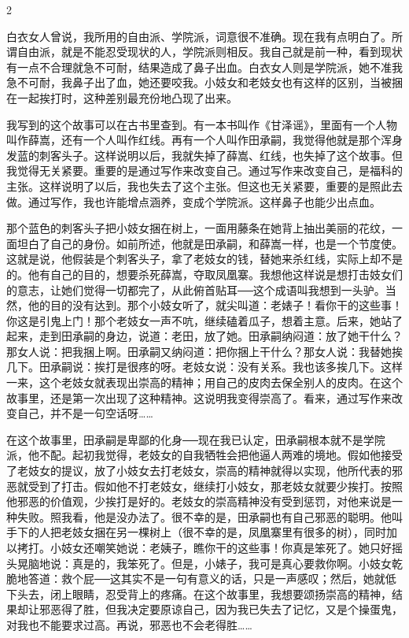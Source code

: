 2 

白衣女人曾说，我所用的自由派、学院派，词意很不准确。现在我有点明白了。所谓自由派，就是不能忍受现状的人，学院派则相反。我自己就是前一种，看到现状有一点不合理就急不可耐，结果造成了鼻子出血。白衣女人则是学院派，她不准我急不可耐，我鼻子出了血，她还要咬我。小妓女和老妓女也有这样的区别，当被捆在一起挨打时，这种差别最充份地凸现了出来。 

我写到的这个故事可以在古书里查到。有一本书叫作《甘泽谣》，里面有一个人物叫作薛嵩，还有一个人叫作红线。再有一个人叫作田承嗣，我觉得他就是那个浑身发蓝的刺客头子。这样说明以后，我就失掉了薛嵩、红线，也失掉了这个故事。但我觉得无关紧要。重要的是通过写作来改变自己。通过写作来改变自己，是福科的主张。这样说明了以后，我也失去了这个主张。但这也无关紧要，重要的是照此去做。通过写作，我也许能增点涵养，变成个学院派。这样鼻子也能少出点血。 

那个蓝色的刺客头子把小妓女捆在树上，一面用藤条在她背上抽出美丽的花纹，一面坦白了自己的身份。如前所述，他就是田承嗣，和薛嵩一样，也是一个节度使。这就是说，他假装是个刺客头子，拿了老妓女的钱，替她来杀红线，实际上却不是的。他有自己的目的，想要杀死薛嵩，夺取凤凰寨。我想他这样说是想打击妓女们的意志，让她们觉得一切都完了，从此俯首贴耳──这个成语叫我想到一头驴。当然，他的目的没有达到。那个小妓女听了，就尖叫道：老婊子！看你干的这些事！你这是引鬼上门！那个老妓女一声不吭，继续磕着瓜子，想着主意。后来，她站了起来，走到田承嗣的身边，说道：老田，放了她。田承嗣纳闷道：放了她干什么？那女人说：把我捆上啊。田承嗣又纳闷道：把你捆上干什么？那女人说：我替她挨几下。田承嗣说：挨打是很疼的呀。老妓女说：没有关系。我也该多挨几下。这样一来，这个老妓女就表现出崇高的精神；用自己的皮肉去保全别人的皮肉。在这个故事里，还是第一次出现了这种精神。这说明我变得崇高了。看来，通过写作来改变自己，并不是一句空话呀…… 

在这个故事里，田承嗣是卑鄙的化身──现在我已认定，田承嗣根本就不是学院派，他不配。起初我觉得，老妓女的自我牺牲会把他逼人两难的境地。假如他接受了老妓女的提议，放了小妓女去打老妓女，崇高的精神就得以实现，他所代表的邪恶就受到了打击。假如他不打老妓女，继续打小妓女，那老妓女就要少挨打。按照他邪恶的价值观，少挨打是好的。老妓女的崇高精神没有受到惩罚，对他来说是一种失败。照我看，他是没办法了。很不幸的是，田承嗣也有自己邪恶的聪明。他叫手下的人把老妓女捆在另一棵树上（很不幸的是，凤凰寨里有很多的树），同时加以拷打。小妓女还嘲笑她说：老姨子，瞧你干的这些事！你真是笨死了。她只好摇头晃脑地说：真是的，我笨死了。但是，小婊子，我可是真心要救你啊。小妓女乾脆地答道：救个屁──这其实不是一句有意义的话，只是一声感叹；然后，她就低下头去，闭上眼睛，忍受背上的疼痛。在这个故事里，我想要颂扬崇高的精神，结果却让邪恶得了胜，但我决定要原谅自己，因为我已失去了记忆，又是个操蛋鬼，对我也不能要求过高。再说，邪恶也不会老得胜…… 

